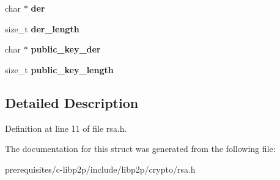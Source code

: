 \begin{DoxyCompactItemize}
char $\ast$ {\bfseries der}
\item 
\mbox{\label{struct_rsa_private_key_aecadaf24e44c789aa67a8ce52271ddea}} 
size\+\_\+t {\bfseries der\+\_\+length}
\item 
\mbox{\label{struct_rsa_private_key_a978a5e2c71b05b29699763d8f3f07926}} 
char $\ast$ {\bfseries public\+\_\+key\+\_\+der}
\item 
\mbox{\label{struct_rsa_private_key_af500995bd509dc29067f3e0a8bd95535}} 
size\+\_\+t {\bfseries public\+\_\+key\+\_\+length}
\end{DoxyCompactItemize}


\subsection{Detailed Description}


Definition at line 11 of file rsa.\+h.



The documentation for this struct was generated from the following file\+:\begin{DoxyCompactItemize}
\item 
prerequisites/c-\/libp2p/include/libp2p/crypto/rsa.\+h\end{DoxyCompactItemize}
